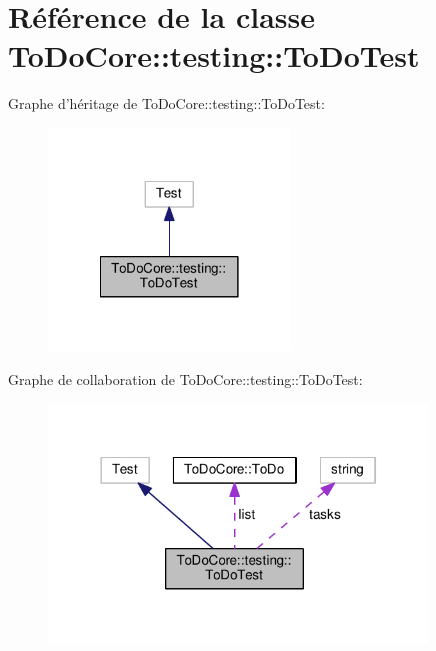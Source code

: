 \hypertarget{class_to_do_core_1_1testing_1_1_to_do_test}{\section{Référence de la classe To\+Do\+Core\+:\+:testing\+:\+:To\+Do\+Test}
\label{class_to_do_core_1_1testing_1_1_to_do_test}
}


Graphe d'héritage de To\+Do\+Core\+:\+:testing\+:\+:To\+Do\+Test\+:\nopagebreak
\begin{figure}[H]
\begin{center}
\leavevmode
\includegraphics[width=182pt]{class_to_do_core_1_1testing_1_1_to_do_test__inherit__graph}
\end{center}
\end{figure}


Graphe de collaboration de To\+Do\+Core\+:\+:testing\+:\+:To\+Do\+Test\+:\nopagebreak
\begin{figure}[H]
\begin{center}
\leavevmode
\includegraphics[width=285pt]{class_to_do_core_1_1testing_1_1_to_do_test__coll__graph}
\end{center}
\end{figure}
